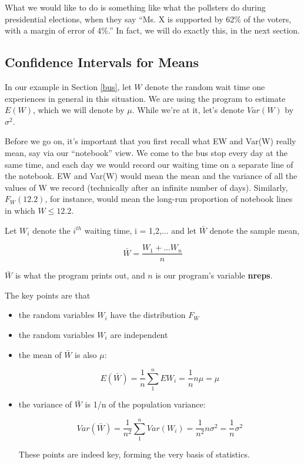 What we would like to do is something like what the pollsters do during
presidential elections, when they say ``Ms. X is supported by 62\% of
the voters, with a margin of error of 4\%.''  In fact, we will do
exactly this, in the next section.

\subsection{Confidence Intervals for Means}
\label{cim}

In our example in Section \ref{bus}, let $W$ denote the random wait
time one experiences in general in this situation.  We are using the
program to estimate $E(W)$, which we will denote by $\mu$.  While we're
at it, let's denote $Var(W)$ by $\sigma^2$.

Before we go on, it's important that you first recall what EW and Var(W)
really mean, say via our ``notebook'' view.  We come to the bus stop
every day at the same time, and each day we would record our waiting
time on a separate line of the notebook.  EW and Var(W) would mean the
mean and the variance of all the values of W we record (technically
after an infinite number of days).  Similarly, $F_W(12.2)$, for
instance, would mean the long-run proportion of notebook lines in which
$W \leq 12.2$.

\checkpoint

Let $W_i$ denote the $i^{th}$ waiting time, i = 1,2,... and let
$\bar{W}$ denote the sample mean,

\begin{equation}
\bar{W} = \frac{W_1+...W_n}{n}
\end{equation}

$\bar{W}$ is what the program prints out, and $n$ is our program's
variable {\bf nreps}. 

The key points are that

\begin{itemize}

\item the random variables $W_i$ have the distribution $F_W$

\item the random variables $W_i$ are independent

\item the mean of $\bar{W}$ is also $\mu$:

\begin{equation}
E(\bar{W}) = \frac{1}{n} \sum_{1}^{n} EW_i = \frac{1}{n} n \mu = \mu
\end{equation}

\item the variance of $\bar{W}$ is 1/n of the population variance:

\begin{equation}
Var(\bar{W}) = \frac{1}{n^2} \sum_{1}^{n} Var(W_i) = \frac{1}{n^2} n
\sigma^2 = \frac{1}{n} \sigma^2
\end{equation}

These points are indeed key, forming the very basis of statistics.

\checkpoint

\end{itemize}


